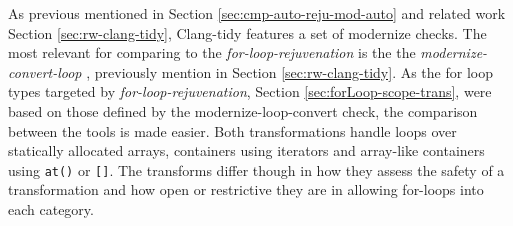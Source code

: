 \documentclass[bsc,frontabs,singlespacing,twoside,parskip,deptreport]{infthesis}
\begin{document}
As previous mentioned in Section \ref{sec:cmp-auto-reju-mod-auto} and related work Section \ref{sec:rw-clang-tidy}, Clang-tidy features a set of modernize checks. The most relevant for comparing to the \textit{for-loop-rejuvenation} is the the \textit{modernize-convert-loop} \cite{FOR_CONVERT}, previously mention in Section \ref{sec:rw-clang-tidy}. As the for loop types targeted by \textit{for-loop-rejuvenation}, Section \ref{sec:forLoop-scope-trans}, were based on those defined by the modernize-loop-convert check, the comparison between the tools is made easier. Both transformations handle loops over statically allocated arrays, containers using iterators and array-like containers using \texttt{at()} or \texttt{[]}. The transforms differ though in how they assess the safety of a transformation and how open or restrictive they are in allowing for-loops into each category. 
\end{document}
